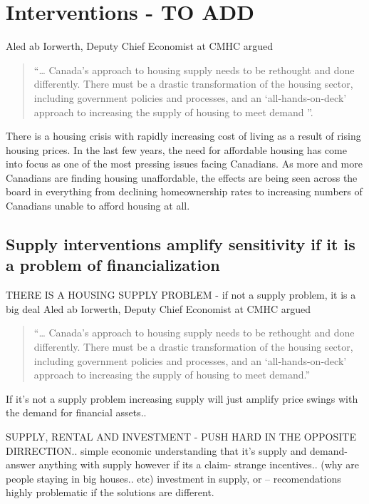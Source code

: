 \chapter{Interventions - TO ADD} \label{chapter-interventions}

Aled ab Iorwerth, Deputy Chief Economist at CMHC argued
\begin{quotation}
     “… Canada’s approach to housing supply needs to be rethought and done differently. There must be a drastic transformation of the housing sector, including government policies and processes, and an ‘all-hands-on-deck’ approach to increasing the supply of housing to meet demand ”\cite{CanadaHousingSupply2022}.
\end{quotation}

There is a housing crisis with rapidly increasing cost of living as a result of rising housing prices. 
In the last few years, the need for affordable housing has come into focus as one of the most pressing issues facing Canadians. As more and more Canadians are finding housing unaffordable, the effects are being seen across the board in everything from declining homeownership rates to increasing numbers of Canadians unable to afford housing at all.





\section{Supply interventions amplify sensitivity if it is a problem of financialization}

THERE IS A HOUSING SUPPLY PROBLEM  - if not a supply problem, it is a big deal
Aled ab Iorwerth, Deputy Chief Economist at CMHC argued
\begin{quotation}
     “… Canada’s approach to housing supply needs to be rethought and done differently. There must be a drastic transformation of the housing sector, including government policies and processes, and an ‘all-hands-on-deck’ approach to increasing the supply of housing to meet demand.”\cite{CanadaHousingSupply2022}
\end{quotation}

If it's not a supply problem increasing supply will just amplify price swings with the demand for financial assets..


SUPPLY, RENTAL AND INVESTMENT - PUSH HARD IN THE OPPOSITE DIRRECTION..
simple economic understanding that it's supply and demand- answer anything with supply
however if its a claim- strange incentives.. (why are people staying in big houses.. etc)
investment in supply, or 
-- recomendations highly problematic if the solutions are different. 


